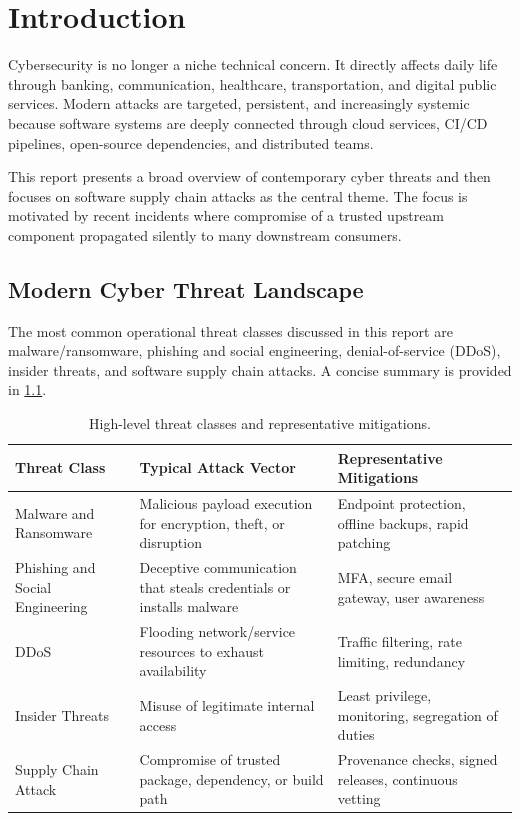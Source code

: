 \chapter{Introduction}
\label{ch:introduction}

Cybersecurity is no longer a niche technical concern. It directly affects daily life through
banking, communication, healthcare, transportation, and digital public services.
Modern attacks are targeted, persistent, and increasingly systemic because software systems
are deeply connected through cloud services, CI/CD pipelines, open-source dependencies,
and distributed teams.

This report presents a broad overview of contemporary cyber threats and then focuses on
software supply chain attacks as the central theme. The focus is motivated by recent incidents
where compromise of a trusted upstream component propagated silently to many downstream
consumers.

\section{Modern Cyber Threat Landscape}

The most common operational threat classes discussed in this report are malware/ransomware,
phishing and social engineering, denial-of-service (DDoS), insider threats, and software supply
chain attacks. A concise summary is provided in \cref{tab:threat-overview}.

\begin{table}[htbp]
\centering
\caption{High-level threat classes and representative mitigations.}
\label{tab:threat-overview}
\begin{tabular}{p{} p{} p{}}
\toprule
\textbf{Threat Class} & \textbf{Typical Attack Vector} & \textbf{Representative Mitigations} \\
\midrule
Malware and Ransomware & Malicious payload execution for encryption, theft, or disruption & Endpoint protection, offline backups, rapid patching \\
Phishing and Social Engineering & Deceptive communication that steals credentials or installs malware & MFA, secure email gateway, user awareness \\
DDoS & Flooding network/service resources to exhaust availability & Traffic filtering, rate limiting, redundancy \\
Insider Threats & Misuse of legitimate internal access & Least privilege, monitoring, segregation of duties \\
Supply Chain Attack & Compromise of trusted package, dependency, or build path & Provenance checks, signed releases, continuous vetting \\
\bottomrule
\end{tabular}
\end{table}

